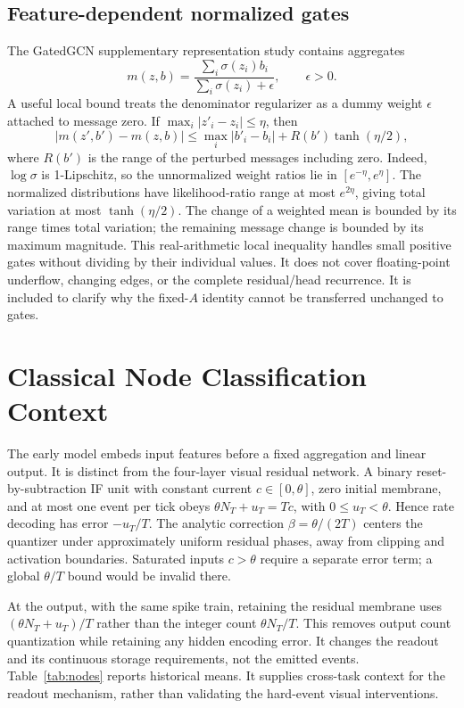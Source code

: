 \documentclass[10pt,twocolumn,letterpaper]{article}
\begin{document}
\subsection{Feature-dependent normalized gates}
The GatedGCN supplementary representation study contains aggregates
\[
 m(z,b)=\frac{\sum_i\sigma(z_i)b_i}{\sum_i\sigma(z_i)+\epsilon},\qquad \epsilon>0.
\]
A useful local bound treats the denominator regularizer as a dummy weight $\epsilon$ attached to message zero. If $\max_i|z'_i-z_i|\leq\eta$, then
\[
 |m(z',b')-m(z,b)|\leq\max_i|b'_i-b_i|+R(b')\tanh(\eta/2),
\]
where $R(b')$ is the range of the perturbed messages including zero. Indeed, $\log\sigma$ is 1-Lipschitz, so the unnormalized weight ratios lie in $[e^{-\eta},e^{\eta}]$. The normalized distributions have likelihood-ratio range at most $e^{2\eta}$, giving total variation at most $\tanh(\eta/2)$. The change of a weighted mean is bounded by its range times total variation; the remaining message change is bounded by its maximum magnitude. This real-arithmetic local inequality handles small positive gates without dividing by their individual values. It does not cover floating-point underflow, changing edges, or the complete residual/head recurrence. It is included to clarify why the fixed-$A$ identity cannot be transferred unchanged to gates.

\section{Classical Node Classification Context}
The early model embeds input features before a fixed aggregation and linear output. It is distinct from the four-layer visual residual network. A binary reset-by-subtraction IF unit with constant current $c\in[0,\theta]$, zero initial membrane, and at most one event per tick obeys $\theta N_T+u_T=Tc$, with $0\leq u_T<\theta$. Hence rate decoding has error $-u_T/T$. The analytic correction $\beta=\theta/(2T)$ centers the quantizer under approximately uniform residual phases, away from clipping and activation boundaries. Saturated inputs $c>\theta$ require a separate error term; a global $\theta/T$ bound would be invalid there.

At the output, with the same spike train, retaining the residual membrane uses $(\theta N_T+u_T)/T$ rather than the integer count $\theta N_T/T$. This removes output count quantization while retaining any hidden encoding error. It changes the readout and its continuous storage requirements, not the emitted events. Table~\ref{tab:nodes} reports historical means. It supplies cross-task context for the readout mechanism, rather than validating the hard-event visual interventions.
\end{document}
